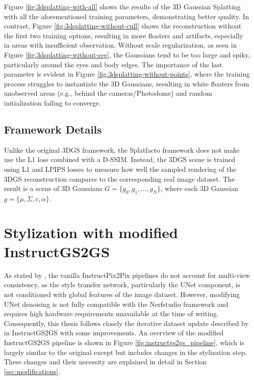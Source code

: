 Figure \ref{fig:3dsplatting-with-all} shows the results of the 3D Gaussian Splatting with all the aforementioned training parameters, demonstrating better quality. In contrast, Figure \ref{fig:3dsplatting-without-cull} shows the reconstruction without the first two training options, resulting in more floaters and artifacts, especially in areas with insufficient observation. Without scale regularization, as seen in Figure \ref{fig:3dsplatting-without-reg}, the Gaussians tend to be too large and spiky, particularly around the eyes and body edges. The importance of the last parameter is evident in Figure \ref{fig:3dsplatting-without-points}, where the training process struggles to instantiate the 3D Gaussians, resulting in white floaters from unobserved areas (e.g., behind the cameras/Photodome) and random initialization failing to converge.


\subsection{Framework Details}
Unlike the original 3DGS framework, the Splatfacto framework does not make use the L1 loss combined with a D-SSIM. Instead, the 3DGS scene is trained using L1 and LPIPS losses to measure how well the sampled rendering of the 3DGS reconstruction compares to the corresponding real image dataset. The result is a scene of 3D Gaussians $G = \{g_0, g_1, \dots, g_N\}$, where each 3D Gaussian $g = \{\mu, \Sigma, c, \alpha \}$.


\section{Stylization with modified InstructGS2GS}
\label{sec:stylization}
As stated by \textcite{Wang.2024, Wu.2024,Chen.2024,Chen.2023a,Jaganathan.2024}, the vanilla InstructPix2Pix pipelines do not account for multi-view consistency, as the style transfer network, particularly the UNet component, is not conditioned with global features of the image dataset. However, modifying UNet denoising is not fully compatible with the Nerfstudio framework and requires high hardware requirements unavailable at the time of writing. Consequently, this thesis follows closely the iterative dataset update described by \Textcite{Haque.2023} in InstructGS2GS with some improvements. An overview of the modified InstructGS2GS pipeline is shown in Figure \ref{fig:instructgs2gs_pipeline}, which is largely similar to the original except but includes changes in the stylization step. These changes and their necessity are explained in detail in Section \ref{sec:modifications}.


